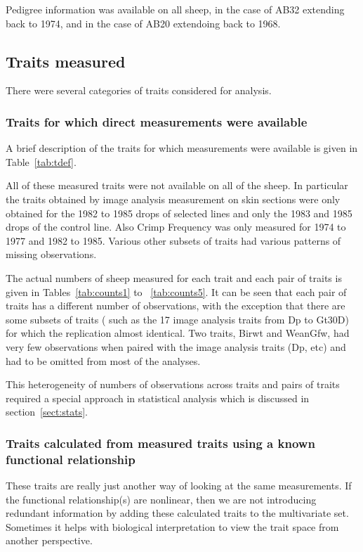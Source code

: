 \documentclass[titlepage]{article}  %
\begin{document}
Pedigree information was available on all sheep, in the case of AB32 extending back to 1974, and in the case of AB20 extendoing back to 1968.

\subsection{Traits measured}
There were several categories of traits considered for analysis. 

\subsubsection{Traits for which direct measurements were available}
A brief description of the traits for which measurements were available is given in Table~\ref{tab:tdef}.



All of these measured traits were not available on all of the sheep. In particular the traits obtained by image analysis measurement on skin sections were only obtained for the 1982 to 1985 drops of selected lines and only the 1983 and 1985 drops of the control line. Also Crimp Frequency was only measured for 1974 to 1977 and 1982 to 1985. Various other subsets of traits had various patterns of missing observations. 

The actual numbers of sheep measured for each trait and each pair of traits is given in Tables~\ref{tab:counts1} to ~\ref{tab:counts5}. It can be seen that each pair of traits has a different number of observations, with the exception that there are some subsets of traits ( such as the 17 image analysis traits from Dp to Gt30D) for which the replication almost identical. Two traits, Birwt and WeanGfw, had very few observations when paired with the image analysis traits (Dp, etc) and had to be omitted from most of the analyses.







This heterogeneity of numbers of observations across traits and pairs of traits required a special approach in statistical analysis which is discussed in section~\ref{sect:stats}.

\subsubsection{Traits calculated from measured traits using a known functional relationship}
These traits are really just another way of looking at the same measurements. If the functional relationship(s) are nonlinear, then we are not introducing redundant information by adding these calculated traits to the multivariate set. Sometimes it helps with biological interpretation to view the trait space from another perspective.
\end{document}
